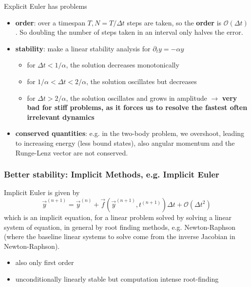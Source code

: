 \textcolor{red1}{Explicit Euler has problems}
\begin{itemize}
    \item \textbf{order}: over a timespan $T, N = T \slash \Delta t$ steps are taken, so the \textbf{order} is $\mathcal{O}(\Delta t)$.
    So doubling the number of steps taken in an interval only halves the error.
    \item \textbf{stability}: make a linear stability analysis for $\partial_t y = -\alpha y$
    \begin{itemize}
        \item for $\Delta t < 1 \slash \alpha$, the solution decreases monotonically
        \item for $1 \slash \alpha < \Delta t < 2 \slash \alpha$, the solution oscillates but decreases
        \item for $\Delta t > 2 \slash \alpha$, the solution oscillates and grows in amplitude $\rightarrow$ \textbf{very bad for stiff problems, as it forces us to resolve the fastest often irrelevant dynamics}
    \end{itemize}
    \item \textbf{conserved quantities}: e.g. in the two-body problem, we overshoot, leading to increasing energy (less bound states),
    also angular momentum and the Runge-Lenz vector are not conserved.
\end{itemize}

\subsubsection*{Better stability: Implicit Methods, e.g. Implicit Euler}
Implicit Euler is given by
\begin{equation}
    \vec{y}^{(n+1)} = \vec{y}^{(n)} + \vec{f} \left( \vec{y}^{(n+1)}, t^{(n + 1)} \right) \Delta t + \mathcal{O}(\Delta t^2)
\end{equation}
which is an implicit equation, for a linear problem solved by solving
a linear system of equation, in general by root finding methods, e.g. Newton-Raphson
(where the baseline linear systems to solve come from the inverse Jacobian in Newton-Raphson).
\begin{itemize}
    \item \textcolor{red1}{also only first order}
    \item \textcolor{green1}{unconditionally linearly stable} but \textcolor{red1}{computation intense root-finding}
\end{itemize}

